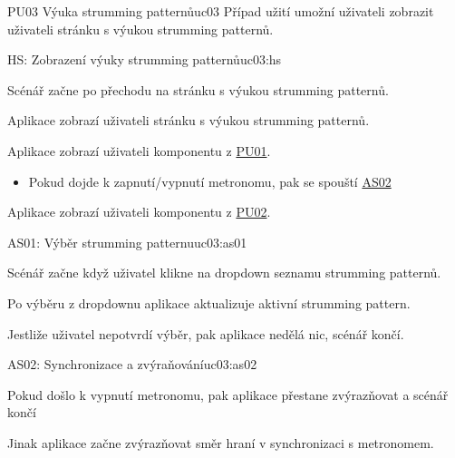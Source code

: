 \begin{usecase}{PU03 Výuka strumming patternů}{uc03}
    Případ užití umožní uživateli zobrazit uživateli stránku s výukou strumming patternů.

    \begin{scenario}{HS: Zobrazení výuky strumming patternů}{uc03:hs}
        \item Scénář začne po přechodu na stránku s výukou strumming patternů.
        \item Aplikace zobrazí uživateli stránku s výukou strumming patternů.
        \item Aplikace zobrazí uživateli komponentu z \hyperref[uc01]{PU01}.
        \begin{itemize}
            \item Pokud dojde k zapnutí/vypnutí metronomu, pak se spouští \hyperref[pu3:as02]{AS02}
        \end{itemize}
        \item Aplikace zobrazí uživateli komponentu z \hyperref[uc02]{PU02}.
    \end{scenario}


    \begin{scenario}{AS01: Výběr strumming patternu}{uc03:as01}
        \item Scénář začne když uživatel klikne na dropdown seznamu strumming patternů.
        \item Po výběru z dropdownu aplikace aktualizuje aktivní strumming pattern.
        \item Jestliže uživatel nepotvrdí výběr, pak aplikace nedělá nic, scénář končí.
            
    \end{scenario}
    
    \begin{scenario}{AS02: Synchronizace a zvýraňování}{uc03:as02}
        \item Pokud došlo k vypnutí metronomu, pak aplikace přestane zvýrazňovat a scénář končí
        \item Jinak aplikace začne zvýrazňovat směr hraní v synchronizaci s metronomem.
    \end{scenario}
\end{usecase}